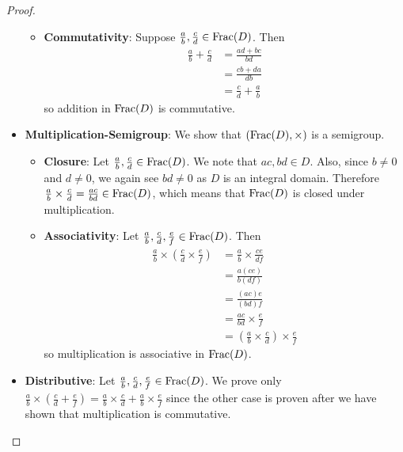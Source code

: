 \begin{proof}
\begin{itemize}
\begin{itemize}
            \item \textbf{Commutativity}: Suppose $\frac ab, \frac cd \in \mathrm{Frac}(D)$. Then
            \begin{align*}
                \frac ab + \frac cd &= \frac{ad + bc}{bd}\\
                &= \frac{cb + da}{db}\\
                &= \frac cd + \frac ab
            \end{align*}
            so addition in $\mathrm{Frac}(D)$ is commutative.
        \end{itemize}

        \item \textbf{Multiplication-Semigroup}: We show that $(\mathrm{Frac}(D), \times)$ is a semigroup.
        \begin{itemize}
            \item \textbf{Closure}: Let $\frac ab, \frac cd \in \mathrm{Frac}(D)$. We note that $ac, bd \in D$. Also, since $b \neq 0$ and $d \neq 0$, we again see $bd \neq 0$ as $D$ is an integral domain. Therefore $\frac ab \times \frac cd = \frac{ac}{bd} \in \mathrm{Frac}(D)$, which means that $\mathrm{Frac}(D)$ is closed under multiplication.

            \item \textbf{Associativity}: Let $\frac ab, \frac cd, \frac ef \in \mathrm{Frac}(D)$. Then
            \begin{align*}
                \frac ab \times \left(\frac cd \times \frac ef\right) &= \frac ab \times \frac {ce}{df}\\
                &= \frac {a(ce)}{b(df)}\\
                &= \frac {(ac)e}{(bd)f}\\
                &= \frac {ac}{bd} \times \frac ef\\
                &= \left(\frac ab \times \frac cd\right) \times \frac ef
            \end{align*}
            so multiplication is associative in $\mathrm{Frac}(D)$.
        \end{itemize}

        \item \textbf{Distributive}: Let $\frac ab, \frac cd, \frac ef \in \mathrm{Frac}(D)$. We prove only $\frac ab \times \left(\frac cd + \frac ef\right) = \frac ab \times \frac cd + \frac ab \times \frac ef$ since the other case is proven after we have shown that multiplication is commutative.


\end{itemize}
\end{proof}
